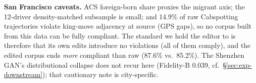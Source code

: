 \textbf{San Francisco caveats.} ACS foreign-born share proxies the migrant 
axis; the 12-driver density-matched subsample is small; and 14.9\% of raw
Cabspotting trajectories violate king-move adjacency at source (GPS gaps),
so no corpus built from this data can be fully compliant. The standard we
hold the editor to is therefore that its own edits introduce no violations
(all of them comply), and the edited corpus ends \emph{more} compliant than
raw (87.6\% vs.\ 85.2\%). The Shenzhen GAN's distributional collapse does
not recur here (Fidelity-B 0.039, cf.\ \S\ref{sec:exp-downstream}); that
cautionary note is city-specific.
